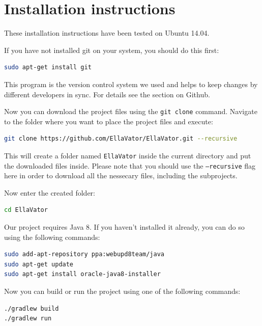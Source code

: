 \documentclass[a4paper, 12pt]{article}
\begin{document}
\newpage
\section{Installation instructions}
These installation instructions have been tested on Ubuntu 14.04.

If you have not installed git on your system, you should do this first:
\begin{lstlisting}[language=bash]
sudo apt-get install git
\end{lstlisting}

This program is the version control system we used and helps to keep changes by different developers in sync.
For details see the section on Github.

Now you can download the project files using the \texttt{git clone} command.
Navigate to the folder where you want to place the project files and execute:
\begin{lstlisting}[language=bash]
git clone https://github.com/EllaVator/EllaVator.git --recursive
\end{lstlisting}

This will create a folder named \texttt{EllaVator} inside the current directory and put the downloaded files inside.
Please note that you should use the \texttt{--recursive} flag here in order to download all the nessecary files, including the subprojects.

Now enter the created folder:
\begin{lstlisting}[language=bash]
cd EllaVator
\end{lstlisting}

Our project requires Java 8. If you haven't installed it already, you can do so using the following commands:
\begin{lstlisting}[language=bash]
sudo add-apt-repository ppa:webupd8team/java
sudo apt-get update
sudo apt-get install oracle-java8-installer
\end{lstlisting}

Now you can build or run the project using one of the following commands:
\begin{lstlisting}[language=bash]
./gradlew build
./gradlew run
\end{lstlisting}

\cleardoublepage


\end{document}
